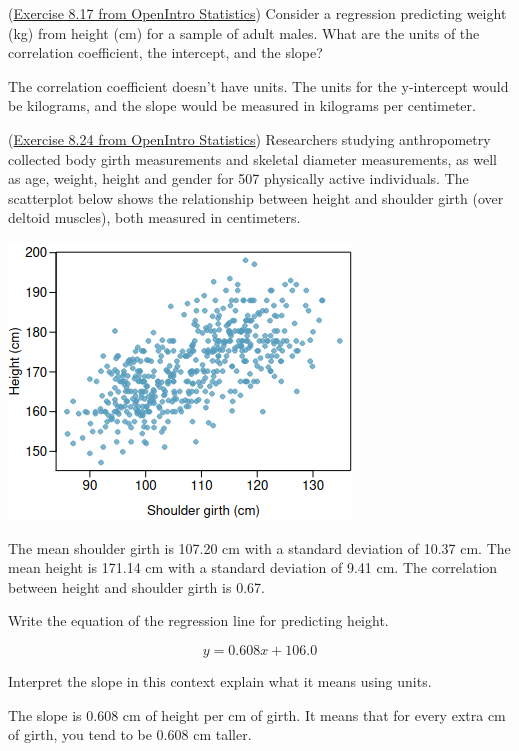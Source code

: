 \documentclass[12pt,answers]{exam}
\begin{document}
\begin{questions}
\question (\href{http://people.hsc.edu/faculty-staff/blins/books/OpenIntroStats4e.pdf\#eoce.8.17}{Exercise 8.17 from OpenIntro Statistics}) Consider a regression predicting weight (kg) from height (cm) for a sample of
adult males. What are the units of the correlation coefficient, the intercept, and the slope?

\begin{solution}
The correlation coefficient doesn't have units.  The units for the y-intercept would be kilograms, and the slope would be measured in kilograms per centimeter. 
\end{solution}
\bigskip


\question (\href{http://people.hsc.edu/faculty-staff/blins/books/OpenIntroStats4e.pdf\#eoce.8.24}{Exercise 8.24 from OpenIntro Statistics}) Researchers studying anthropometry collected body girth measurements
and skeletal diameter measurements, as well as age, weight, height and gender for 507 physically active
individuals. The scatterplot below shows the relationship between height and shoulder girth (over deltoid
muscles), both measured in centimeters. 
\begin{center}
\includegraphics[scale=0.6]{girth.png}
\end{center}
The mean shoulder girth is 107.20 cm with a standard deviation of 10.37 cm. The mean
height is 171.14 cm with a standard deviation of 9.41 cm. The correlation between height and shoulder girth
is 0.67.
\begin{parts}
\item Write the equation of the regression line for predicting height.
\begin{solution}
$$y = 0.608 x + 106.0$$
\end{solution}
\bigskip

\item Interpret the slope in this context explain what it means using units.
\begin{solution}
The slope is 0.608 cm of height per cm of girth.  It means that for every extra cm of girth, you tend to be 0.608 cm taller.
\end{solution}
\bigskip


\end{parts}
\end{questions}
\end{document}
